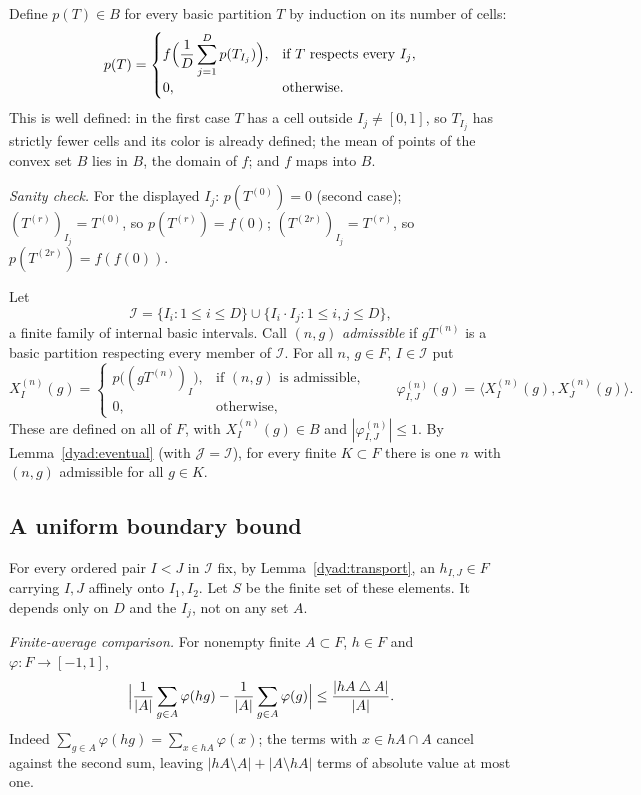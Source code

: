 \documentclass[11pt]{article}
\newcommand{\ip}[2]{\langle #1,#2\rangle}
\theoremstyle{definition}
\numberwithin{equation}{section}
\begin{document}
Define $p(T)\in B$ for every basic partition $T$ by induction on its
number of cells:
\begin{equation}\label{color:recursion}
  p(T)=
  \begin{cases}
  \displaystyle f\Bigl(\frac1D\sum_{j=1}^Dp(T_{I_j})\Bigr),
       &\text{if $T$ respects every $I_j$},\\[6pt]
  0,   &\text{otherwise}.
  \end{cases}
\end{equation}
This is well defined: in the first case $T$ has a cell outside
$I_j\ne[0,1]$, so $T_{I_j}$ has strictly fewer cells and its color is
already defined; the mean of points of the convex set $B$ lies in $B$,
the domain of $f$; and $f$ maps into $B$.

\emph{Sanity check.} For the displayed $I_j$: $p(T^{(0)})=0$ (second
case); $(T^{(r)})_{I_j}=T^{(0)}$, so $p(T^{(r)})=f(0)$;
$(T^{(2r)})_{I_j}=T^{(r)}$, so $p(T^{(2r)})=f(f(0))$.

Let
\[
  \mathcal I=\{I_i:1\leq i\leq D\}\cup\{I_i\cdot I_j:1\leq i,j\leq D\},
\]
a finite family of internal basic intervals. Call $(n,g)$
\emph{admissible} if $gT^{(n)}$ is a basic partition respecting every
member of $\mathcal I$. For all $n$, $g\in F$, $I\in\mathcal I$ put
\begin{equation}\label{color:global}
  X_I^{(n)}(g)=
  \begin{cases}
    p\bigl((gT^{(n)})_I\bigr),&\text{if $(n,g)$ is admissible},\\
    0,&\text{otherwise},
  \end{cases}
  \qquad
  \varphi_{I,J}^{(n)}(g)=\ip{X_I^{(n)}(g)}{X_J^{(n)}(g)}.
\end{equation}
These are defined on all of $F$, with $X_I^{(n)}(g)\in B$ and
$|\varphi_{I,J}^{(n)}|\le1$. By Lemma~\ref{dyad:eventual} (with
$\mathcal J=\mathcal I$), for every finite $K\subset F$ there is one $n$
with $(n,g)$ admissible for all $g\in K$.

\subsection{A uniform boundary bound}\label{sec:boundary}

For every ordered pair $I<J$ in $\mathcal I$ fix, by
Lemma~\ref{dyad:transport}, an $h_{I,J}\in F$ carrying $I,J$ affinely
onto $I_1,I_2$. Let $S$ be the finite set of these elements. It depends
only on $D$ and the $I_j$, not on any set $A$.

\emph{Finite-average comparison.} For nonempty finite $A\subset F$,
$h\in F$ and $\varphi:F\to[-1,1]$,
\begin{equation}\label{eq:finite-translation}
 \Bigl|\frac1{|A|}\sum_{g\in A}\varphi(hg)
       -\frac1{|A|}\sum_{g\in A}\varphi(g)\Bigr|
 \le\frac{|hA\mathbin{\triangle}A|}{|A|}.
\end{equation}
Indeed $\sum_{g\in A}\varphi(hg)=\sum_{x\in hA}\varphi(x)$; the terms
with $x\in hA\cap A$ cancel against the second sum, leaving
$|hA\setminus A|+|A\setminus hA|$ terms of absolute value at most one.
\end{document}
